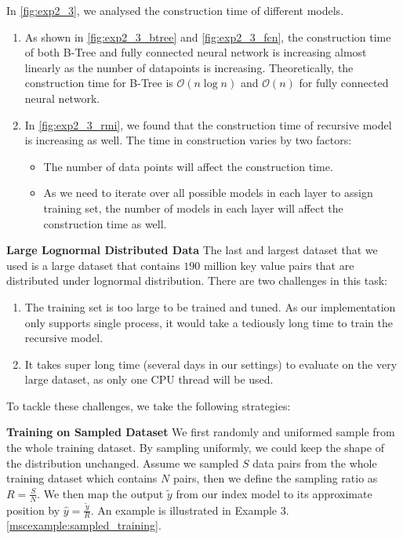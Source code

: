 \begin{mscconclusion}
	In \ref{fig:exp2_3}, we analysed the construction time of different models.
	\begin{enumerate}
		\item As shown in \ref{fig:exp2_3_btree} and \ref{fig:exp2_3_fcn}, the construction time of both B-Tree and fully connected neural network is increasing almost linearly as the number of datapoints is increasing. Theoretically, the construction time for B-Tree is $\mathcal{O}(n\log n)$ and $\mathcal{O}(n)$ for fully connected neural network.
		\item In \ref{fig:exp2_3_rmi}, we found that the construction time of recursive model is increasing as well. The time in construction varies by two factors:
			\begin{itemize}
				\item The number of data points will affect the construction time.
				\item As we need to iterate over all possible models in each layer to assign training set, the number of models in each layer will affect the construction time as well.
			\end{itemize}
	\end{enumerate}
\end{mscconclusion}

\textbf{Large Lognormal Distributed Data} The last and largest dataset that we used is a large dataset that contains $190$ million key value pairs that are distributed under lognormal distribution. There are two challenges in this task:

\begin{enumerate}
	\item The training set is too large to be trained and tuned. As our implementation only supports single process, it would take a tediously long time to train the recursive model.
	\item It takes super long time (several days in our settings) to evaluate on the very large dataset, as only one CPU thread will be used.
\end{enumerate}

To tackle these challenges, we take the following strategies:

\textbf{Training on Sampled Dataset} We first randomly and uniformed sample from the whole training dataset. By sampling uniformly, we could keep the shape of the distribution unchanged. Assume we sampled $S$ data pairs from the whole training dataset which contains $N$ pairs, then we define the sampling ratio as $R=\frac{S}{N}$. We then map the output $\tilde{y}$ from our index model to its approximate position by $\hat{y}=\frac{\tilde{y}}{R}$. An example is illustrated in Example 3.\ref{mscexample:sampled_training}.

